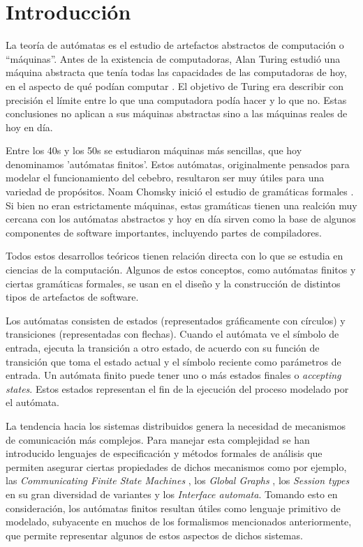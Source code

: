 \section{Introducción}
La teoría de autómatas es el estudio de artefactos abstractos de computación o ``máquinas''. Antes de la existencia de computadoras, Alan Turing estudió una máquina abstracta que tenía todas las capacidades de las computadoras de hoy, en el aspecto de qué podían computar \cite{turing:plms-s2-42_1,turing:plms-s2-43_1}. El objetivo de Turing era describir con precisión el límite entre lo que una computadora podía hacer y lo que no. Estas conclusiones no aplican a sus máquinas abstractas sino a las máquinas reales de hoy en día.

Entre los 40s y los 50s se estudiaron máquinas más sencillas, que hoy denominamos 'autómatas finitos'. Estos autómatas, originalmente pensados para modelar el funcionamiento del cebebro, resultaron ser muy útiles para una variedad de propósitos. Noam Chomsky inició el estudio de gramáticas formales \cite{chomsky:iretit-2_3}. Si bien no eran estrictamente máquinas, estas gramáticas tienen una realción muy cercana con los autómatas abstractos y hoy en día sirven como la base de algunos componentes de software importantes, incluyendo partes de compiladores.

Todos estos desarrollos teóricos tienen relación directa con lo que se estudia en ciencias de la computación. Algunos de estos conceptos, como autómatas finitos y ciertas gramáticas formales, se usan en el diseño y la construcción de distintos tipos de artefactos de software.

Los autómatas consisten de estados (representados gráficamente con círculos) y transiciones (representadas con flechas). Cuando el autómata ve el símbolo de entrada, ejecuta la transición a otro estado, de acuerdo con su función de transición que toma el estado actual y el símbolo reciente como parámetros de entrada. Un autómata finito puede tener uno o más estados finales o \emph{accepting states}. Estos estados representan el fin de la ejecución del proceso modelado por el autómata.

La tendencia hacia los sistemas distribuidos genera la necesidad de mecanismos de comunicación más complejos. Para manejar esta complejidad se han introducido lenguajes de especificación y métodos formales de análisis que permiten asegurar ciertas propiedades de dichos mecanismos como por ejemplo, las \emph{Communicating Finite State Machines} \cite{CFSM}, los \emph{Global Graphs} \cite{castagna:lmcs-8_1}, los \emph{Session types} en su gran diversidad de variantes \cite{honda:esop98,honda:popl08} y los \emph{Interface automata}\cite{dealfaro:esec-fse-01}. Tomando esto en consideración, los autómatas finitos resultan útiles como lenguaje primitivo de modelado, subyacente en muchos de los formalismos mencionados anteriormente, que permite representar algunos de estos aspectos de dichos sistemas.

